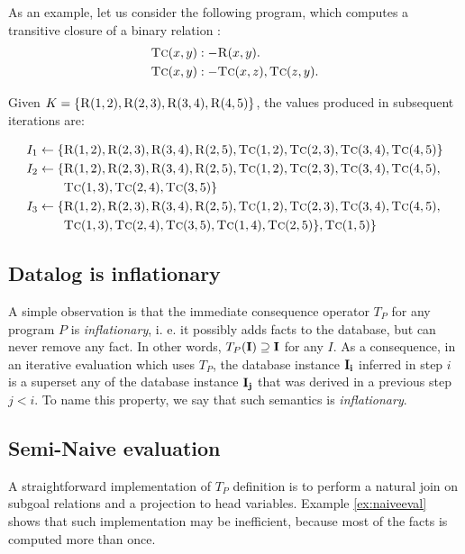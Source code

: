 \begin{exmp}
As an example, let us consider the following program, which computes a transitive closure of a binary relation :
\begin{align}
\textsc{Tc}(x, y) &:- \textsc{R}(x, y).\\
\textsc{Tc}(x, y) &:- \textsc{Tc}(x, z), \textsc{Tc}(z, y).
\end{align}

Given $K = \{\textsc{R}(1, 2), \textsc{R}(2, 3), \textsc{R}(3, 4), \textsc{R}(4, 5)\}$, the values produced in subsequent iterations are:

\begin{align*}
I_1 \leftarrow \{&\textsc{R}(1, 2), \textsc{R}(2, 3), \textsc{R}(3, 4), \textsc{R}(2, 5), \textsc{Tc}(1, 2), \textsc{Tc}(2, 3), \textsc{Tc}(3, 4), \textsc{Tc}(4, 5)\}\\
I_2 \leftarrow \{&\textsc{R}(1, 2), \textsc{R}(2, 3), \textsc{R}(3, 4), \textsc{R}(2, 5), \textsc{Tc}(1, 2), \textsc{Tc}(2, 3), \textsc{Tc}(3, 4), \textsc{Tc}(4, 5), \\
&\textsc{Tc}(1, 3), \textsc{Tc}(2, 4), \textsc{Tc}(3, 5)\}\\
I_3 \leftarrow \{&\textsc{R}(1, 2), \textsc{R}(2, 3), \textsc{R}(3, 4), \textsc{R}(2, 5), \textsc{Tc}(1, 2), \textsc{Tc}(2, 3), \textsc{Tc}(3, 4), \textsc{Tc}(4, 5),\\
& \textsc{Tc}(1, 3), \textsc{Tc}(2, 4), \textsc{Tc}(3, 5), \textsc{Tc}(1, 4), \textsc{Tc}(2, 5)\}, \textsc{Tc}(1, 5)\}\\
\end{align*}
\end{exmp}\label{ex:naiveeval}

\subsection{Datalog is inflationary}

A simple observation is that the immediate consequence operator $T_P$ for any program $P$ is \emph{inflationary}, i. e. it possibly adds facts to the database, but can never remove any fact. In other words, $T_P(\bf{I}) \supseteq \bf{I}$ for any $I$. As a consequence, in an iterative evaluation which uses $T_P$, the database instance $\bf{I}_i$ inferred in step $i$ is a superset any of the database instance $\bf{I}_j$ that was derived in a previous step $j < i$. To name this property, we say that such semantics is \emph{inflationary}.

\subsection{Semi-Naive evaluation}
A straightforward implementation of $T_P$ definition is to perform a natural join on subgoal relations and a projection to head variables. Example \ref{ex:naiveeval} shows that such implementation may be inefficient, because most of the facts is computed more than once.

